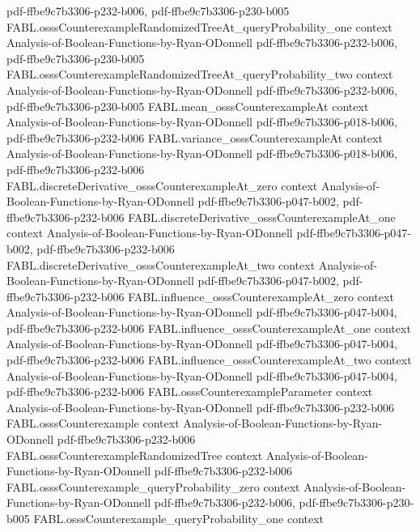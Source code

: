 \begin{theorem}
  {pdf-ffbe9c7b3306-p232-b006,
    pdf-ffbe9c7b3306-p230-b005}
\proofstep
  {FABL.osssCounterexampleRandomizedTreeAt_queryProbability_one}
  {context}
  {Analysis-of-Boolean-Functions-by-Ryan-ODonnell}
  {pdf-ffbe9c7b3306-p232-b006,
    pdf-ffbe9c7b3306-p230-b005}
\proofstep
  {FABL.osssCounterexampleRandomizedTreeAt_queryProbability_two}
  {context}
  {Analysis-of-Boolean-Functions-by-Ryan-ODonnell}
  {pdf-ffbe9c7b3306-p232-b006,
    pdf-ffbe9c7b3306-p230-b005}
\proofstep
  {FABL.mean_osssCounterexampleAt}
  {context}
  {Analysis-of-Boolean-Functions-by-Ryan-ODonnell}
  {pdf-ffbe9c7b3306-p018-b006,
    pdf-ffbe9c7b3306-p232-b006}
\proofstep
  {FABL.variance_osssCounterexampleAt}
  {context}
  {Analysis-of-Boolean-Functions-by-Ryan-ODonnell}
  {pdf-ffbe9c7b3306-p018-b006,
    pdf-ffbe9c7b3306-p232-b006}
\proofstep
  {FABL.discreteDerivative_osssCounterexampleAt_zero}
  {context}
  {Analysis-of-Boolean-Functions-by-Ryan-ODonnell}
  {pdf-ffbe9c7b3306-p047-b002,
    pdf-ffbe9c7b3306-p232-b006}
\proofstep
  {FABL.discreteDerivative_osssCounterexampleAt_one}
  {context}
  {Analysis-of-Boolean-Functions-by-Ryan-ODonnell}
  {pdf-ffbe9c7b3306-p047-b002,
    pdf-ffbe9c7b3306-p232-b006}
\proofstep
  {FABL.discreteDerivative_osssCounterexampleAt_two}
  {context}
  {Analysis-of-Boolean-Functions-by-Ryan-ODonnell}
  {pdf-ffbe9c7b3306-p047-b002,
    pdf-ffbe9c7b3306-p232-b006}
\proofstep
  {FABL.influence_osssCounterexampleAt_zero}
  {context}
  {Analysis-of-Boolean-Functions-by-Ryan-ODonnell}
  {pdf-ffbe9c7b3306-p047-b004,
    pdf-ffbe9c7b3306-p232-b006}
\proofstep
  {FABL.influence_osssCounterexampleAt_one}
  {context}
  {Analysis-of-Boolean-Functions-by-Ryan-ODonnell}
  {pdf-ffbe9c7b3306-p047-b004,
    pdf-ffbe9c7b3306-p232-b006}
\proofstep
  {FABL.influence_osssCounterexampleAt_two}
  {context}
  {Analysis-of-Boolean-Functions-by-Ryan-ODonnell}
  {pdf-ffbe9c7b3306-p047-b004,
    pdf-ffbe9c7b3306-p232-b006}
\proofstep
  {FABL.osssCounterexampleParameter}
  {context}
  {Analysis-of-Boolean-Functions-by-Ryan-ODonnell}
  {pdf-ffbe9c7b3306-p232-b006}
\proofstep
  {FABL.osssCounterexample}
  {context}
  {Analysis-of-Boolean-Functions-by-Ryan-ODonnell}
  {pdf-ffbe9c7b3306-p232-b006}
\proofstep
  {FABL.osssCounterexampleRandomizedTree}
  {context}
  {Analysis-of-Boolean-Functions-by-Ryan-ODonnell}
  {pdf-ffbe9c7b3306-p232-b006}
\proofstep
  {FABL.osssCounterexample_queryProbability_zero}
  {context}
  {Analysis-of-Boolean-Functions-by-Ryan-ODonnell}
  {pdf-ffbe9c7b3306-p232-b006,
    pdf-ffbe9c7b3306-p230-b005}
\proofstep
  {FABL.osssCounterexample_queryProbability_one}
  {context}

\end{theorem}
